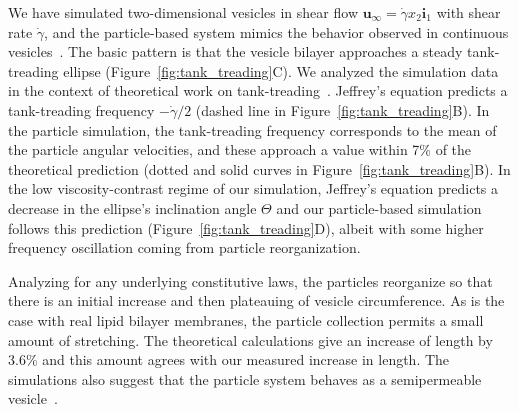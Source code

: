 We have simulated two-dimensional vesicles in shear flow
$\mathbf{u}_{\infty} = \dot{\gamma} x_2 \mathbf{i}_1$ with shear rate
$\dot{\gamma}$,
and the particle-based system mimics the behavior observed in continuous
vesicles~\cite{torres-sanchez_millan_arroyo_2019,
mahapatra_saintillan_rangamani_2020, Steigmann99, C6SM02452A}. The basic
pattern is that the vesicle bilayer approaches a steady tank-treading
ellipse (Figure~\ref{fig:tank_treading}C). We analyzed the simulation
data in the context of theoretical work on
tank-treading~\cite{Finken2008, PhysRevLett.106.158103}.
Jeffrey's equation predicts a
tank-treading frequency $-\dot{\gamma}/2$ (dashed line in
Figure~\ref{fig:tank_treading}B). In the particle simulation, the
tank-treading frequency corresponds to the mean of the particle angular
velocities, and these approach a value within 7\% of the theoretical
prediction (dotted and solid curves in Figure~\ref{fig:tank_treading}B).
In the low viscosity-contrast regime of our simulation, Jeffrey's
equation predicts a decrease in the ellipse's inclination angle $\Theta$
and our particle-based simulation follows this prediction
(Figure~\ref{fig:tank_treading}D), albeit with some higher frequency oscillation
coming from particle reorganization.

Analyzing for any underlying constitutive laws, the particles reorganize
so that there is an initial increase and then plateauing of vesicle
circumference. As is the case with real lipid bilayer membranes, the
particle collection permits a small amount of stretching. The
theoretical calculations give an increase of length by 3.6\% and this amount
agrees with our measured increase in length. The simulations also
suggest that the particle system behaves as a semipermeable
vesicle~\cite{323e9a2f0c58487ea82518d7a1f96485, YAO2017728}.

